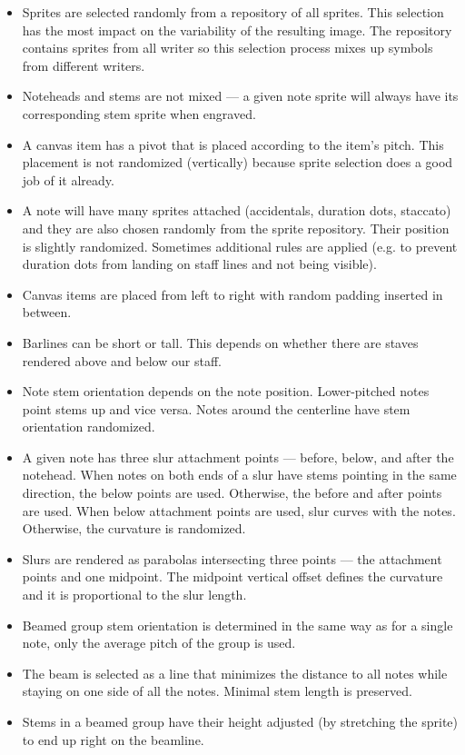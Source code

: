 \begin{itemize}
    \item Sprites are selected randomly from a repository of all sprites. This selection has the most impact on the variability of the resulting image. The repository contains sprites from all writer so this selection process mixes up symbols from different writers.
    \item Noteheads and stems are not mixed --- a given note sprite will always have its corresponding stem sprite when engraved.
    \item A canvas item has a pivot that is placed according to the item's pitch. This placement is not randomized (vertically) because sprite selection does a good job of it already.
    \item A note will have many sprites attached (accidentals, duration dots, staccato) and they are also chosen randomly from the sprite repository. Their position is slightly randomized. Sometimes additional rules are applied (e.g. to prevent duration dots from landing on staff lines and not being visible).
    \item Canvas items are placed from left to right with random padding inserted in between.
    \item Barlines can be short or tall. This depends on whether there are staves rendered above and below our staff.
    \item Note stem orientation depends on the note position. Lower-pitched notes point stems up and vice versa. Notes around the centerline have stem orientation randomized.
    \item A given note has three slur attachment points --- before, below, and after the notehead. When notes on both ends of a slur have stems pointing in the same direction, the below points are used. Otherwise, the before and after points are used. When below attachment points are used, slur curves with the notes. Otherwise, the curvature is randomized.
    \item Slurs are rendered as parabolas intersecting three points --- the attachment points and one midpoint. The midpoint vertical offset defines the curvature and it is proportional to the slur length.
    \item Beamed group stem orientation is determined in the same way as for a single note, only the average pitch of the group is used.
    \item The beam is selected as a line that minimizes the distance to all notes while staying on one side of all the notes. Minimal stem length is preserved.
    \item Stems in a beamed group have their height adjusted (by stretching the sprite) to end up right on the beamline.
\end{itemize}


